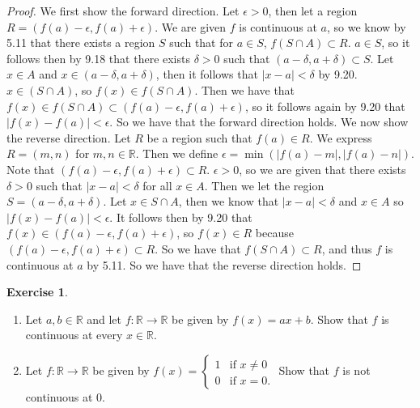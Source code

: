 \documentclass[12pt]{article}
\newcommand{\bbR}{\mathbb{R}}
\renewcommand{\_}[1]{\underline{ #1 }}
\theoremstyle{definition}
\newtheorem{exercise}[theorem]{Exercise}
\numberwithin{equation}{subsection}
\begin{document}
\begin{proof}
We first show the forward direction. \newline
 Let $\epsilon > 0$, then let a region $R = (f(a) - \epsilon, f(a) + \epsilon)$. We are given $f$ is continuous at $a$, so we know by 5.11 that there exists a region $S$ such that for $a \in S$, $f(S \cap A) \subset R$. $a \in S$, so it follows then by 9.18 that there exists $\delta  > 0$ such that $(a - \delta, a + \delta) \subset S$. Let $x \in A$ and $x \in (a - \delta, a + \delta)$, then it follows that $|x - a| < \delta$ by 9.20. $x \in (S \cap A)$, so $f(x) \in f(S \cap A)$. Then we have that $f(x) \in f(S \cap A) \subset (f(a) - \epsilon, f(a) + \epsilon)$, so it follows again by 9.20 that $|f(x) - f(a)| < \epsilon$. So we have that the forward direction holds. \newline
We now show the reverse direction. \newline
Let $R$ be a region such that $f(a) \in R$. We express $R = (m,n)$ for $m,n \in \bbR$. Then we define $\epsilon = \min(|f(a) - m|, |f(a) - n|)$. Note that $(f(a) - \epsilon, f(a) + \epsilon) \subset R$. $\epsilon > 0$, so we are given that there exists $\delta > 0$ such that $|x - a| < \delta$ for all $x \in A$. Then we let the region $S = (a - \delta, a + \delta)$. Let $x \in S \cap A$, then we know that $|x - a| < \delta$ and $x \in A$ so $|f(x) - f(a)| < \epsilon$. It follows then by 9.20 that $f(x) \in (f(a) - \epsilon, f(a) + \epsilon)$, so $f(x) \in R$ because $(f(a) - \epsilon, f(a) + \epsilon) \subset R$. So we have that $f(S \cap A) \subset R$, and thus $f$ is continuous at $a$ by 5.11. So we have that the reverse direction holds. \newline
\end{proof}

\begin{exercise}
\begin{enumerate}
\item Let $a,b\in \bbR$ and let $f:\bbR\longrightarrow \bbR$ be given by $f(x)=ax+b.$ Show that $f$ is continuous at every $x\in\bbR.$
\item Let $f:\bbR\longrightarrow\bbR$ be given by $f(x)=\begin{cases} 1 & \text{if  }x\neq 0\\ 0 & \text{if }x=0.\end{cases}$ Show that $f$ is not continuous at $0.$
\end{enumerate}
\end{exercise}
\end{document}
